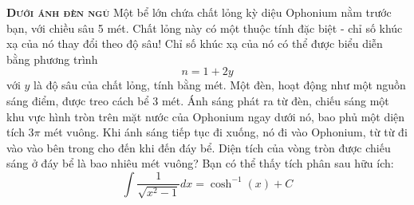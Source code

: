 
\begin{problem}
	{\textbf{\textsc{Dưới ánh đèn ngủ}}} Một bể lớn chứa chất lỏng kỳ diệu Ophonium nằm trước bạn, với chiều sâu 5 mét. Chất lỏng này có một thuộc tính đặc biệt - chỉ số khúc xạ của nó thay đổi theo độ sâu! Chỉ số khúc xạ của nó có thể được biểu diễn bằng phương trình $$n = 1 + 2y$$ với $y$ là độ sâu của chất lỏng, tính bằng mét. Một đèn, hoạt động như một nguồn sáng điểm, được treo cách bể 3 mét. Ánh sáng phát ra từ đèn, chiếu sáng một khu vực hình tròn trên mặt nước của Ophonium ngay dưới nó, bao phủ một diện tích $3\pi$ mét vuông. Khi ánh sáng tiếp tục đi xuống, nó đi vào Ophonium, từ từ đi vào vào bên trong cho đến khi đến đáy bể. Diện tích của vòng tròn được chiếu sáng ở đáy bể là bao nhiêu mét vuông? Bạn có thể thấy tích phân sau hữu ích:
	$$\int\frac{1}{\sqrt{x^2-1}}dx = \cosh^{-1}(x) + C$$
\end{problem}
